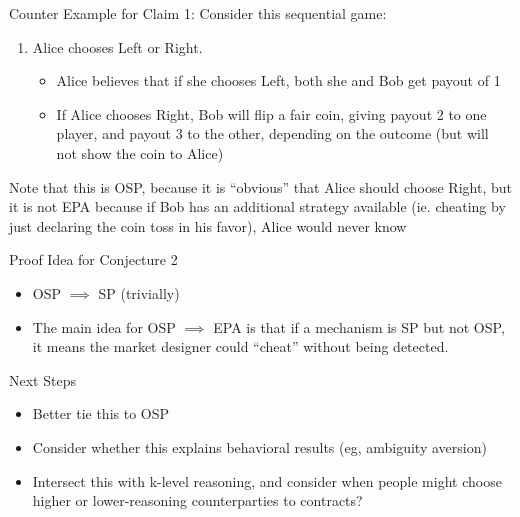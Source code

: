 \documentclass{beamer}
\begin{document}
\begin{frame}{Counter Example for Claim 1:}
	Consider this sequential game:
	\begin{enumerate}
		\item Alice chooses Left or Right.
		\begin{itemize}
			\item Alice believes that if she chooses Left, both she and Bob get payout of 1 
			\item If Alice chooses Right, Bob will flip a fair coin, giving payout 2 to one player, and payout 3 to the other, depending on the outcome (but will not show the coin to Alice)
		\end{itemize}

	\end{enumerate}

Note that this is OSP, because it is ``obvious'' that Alice should choose Right, but it is not EPA because if Bob has an additional strategy available (ie. cheating by just declaring the coin toss in his favor), Alice would never know
\end{frame}




\begin{frame}{Proof Idea for Conjecture 2}
	\begin{itemize}
		\item  OSP $\implies$ SP (trivially)
		\item The main idea for OSP $\implies$ EPA is that if a mechanism is SP but not OSP, it means the market designer could “cheat” without being detected. 

	\end{itemize}
\end{frame}

\begin{frame}{Next Steps}
\begin{itemize}
	\item Better tie this to OSP
	\item Consider whether this explains behavioral results (eg, ambiguity aversion)
	\item Intersect this with k-level reasoning, and consider when people might choose higher or lower-reasoning counterparties to contracts?
\end{itemize}
\end{frame}
\end{document}
